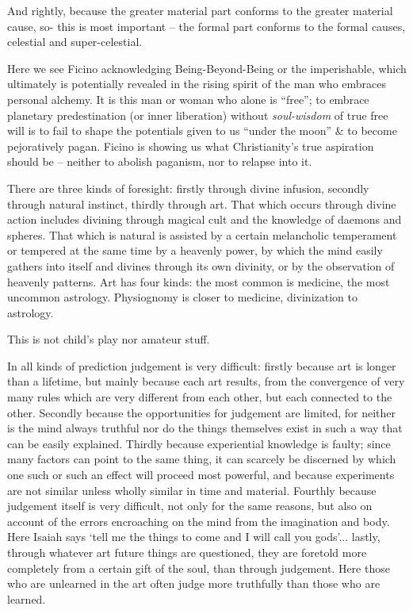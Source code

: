 \begin{quotex}
And rightly, because the greater material part conforms to the greater material cause, so- this is most important -- the formal part conforms to the formal causes, celestial and super-celestial.
\end{quotex}


Here we see Ficino acknowledging Being-Beyond-Being or the imperishable, which ultimately is potentially revealed in the rising spirit of the man who embraces personal alchemy. It is this man or woman who alone is ``free''; to embrace planetary predestination (or inner liberation) without \emph{soul-wisdom} of true free will is to fail to shape the potentials given to us ``under the moon'' \& to become pejoratively pagan. Ficino is showing us what Christianity's true aspiration should be -- neither to abolish paganism, nor to relapse into it.

\begin{quotex}
There are three kinds of foresight: firstly through divine infusion, secondly through natural instinct, thirdly through art. That which occurs through divine action includes divining through magical cult and the knowledge of daemons and spheres. That which is natural is assisted by a certain melancholic temperament or tempered at the same time by a heavenly power, by which the mind easily gathers into itself and divines through its own divinity, or by the observation of heavenly patterns. Art has four kinds: the most common is medicine, the most uncommon astrology. Physiognomy is closer to medicine, divinization to astrology.
\end{quotex}


This is not child's play nor amateur stuff.

\begin{quotex}
In all kinds of prediction judgement is very difficult: firstly because art is longer than a lifetime, but mainly because each art results, from the convergence of very many rules which are very different from each other, but each connected to the other. Secondly because the opportunities for judgement are limited, for neither is the mind always truthful nor do the things themselves exist in such a way that can be easily explained. Thirdly because experiential knowledge is faulty; since many factors can point to the same thing, it can scarcely be discerned by which one such or such an effect will proceed most powerful, and because experiments are not similar unless wholly similar in time and material. Fourthly because judgement itself is very difficult, not only for the same reasons, but also on account of the errors encroaching on the mind from the imagination and body. Here Isaiah says `tell me the things to come and I will call you gods'... lastly, through whatever art future things are questioned, they are foretold more completely from a certain gift of the soul, than through judgement. Here those who are unlearned in the art often judge more truthfully than those who are learned.
\end{quotex}


